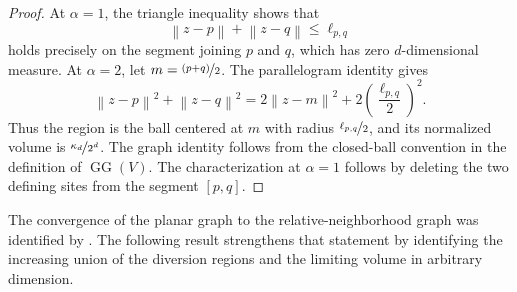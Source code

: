 \documentclass[a4paper,fleqn]{cas-dc}
\theoremstyle{definition}
\theoremstyle{remark}
\newcommand{\norm}[1]{\left\lVert #1\right\rVert}
\newcommand{\ellpq}{\ell_{p,q}}
\newcommand{\0}{\mathbf{0}}
\DeclareMathOperator{\GG}{GG}
\begin{document}
\begin{proof}
At $\alpha=1$, the triangle inequality shows that
\begin{equation}
\norm{z-p}+\norm{z-q}\leq\ellpq
\end{equation}
holds precisely on the segment joining $p$ and $q$, which has zero
$d$-dimensional measure. At $\alpha=2$, let $m=\nicefrac{(p+q)}{2}$. The parallelogram
identity gives
\begin{equation}
\norm{z-p}^2+\norm{z-q}^2
=
2\norm{z-m}^2+2\left(\frac{\ellpq}{2}\right)^2.
\end{equation}
Thus the region is the ball centered at $m$ with radius $\nicefrac{\ellpq}{2}$, and its
normalized volume is $\nicefrac{\kappa_d}{2^d}$.
The graph identity follows from the closed-ball convention in the
definition of $\GG(V)$. The characterization at $\alpha=1$ follows
by deleting the two defining sites from the segment $[p,q]$.
\end{proof}


The convergence of the planar graph to the relative-neighborhood graph was
identified by \citet[Theorem~3.5]{kannangara2018stepping}. The following
result strengthens that statement by identifying the increasing union of the
diversion regions and the limiting volume in arbitrary dimension.
\end{document}
